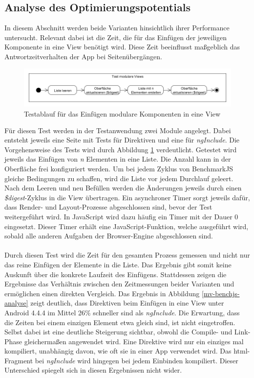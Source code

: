 \subsection{Analyse des Optimierungspotentials}
In diesem Abschnitt werden beide Varianten hinsichtlich ihrer Performance untersucht. Relevant dabei ist die Zeit, die für das Einfügen der jeweiligen Komponente in eine View benötigt wird. Diese Zeit beeinflusst maßgeblich das Antwortzeitverhalten der App bei Seitenübergängen. 
\begin{figure}[h]
	\centering
	\includegraphics[scale=0.4]{Bilder/Testablauf-ModularView.png}
	\caption{Testablauf für das Einfügen modulare Komponenten in eine View}
	\label{test-modulareview}
\end{figure}
Für diesen Test werden in der Testanwendung zwei Module angelegt. Dabei entsteht jeweils eine Seite mit Tests für Direktiven und eine für \emph{ngInclude}. Die Vorgehensweise des Tests wird durch Abbildung \ref{test-modulareview} verdeutlicht. Getestet wird jeweils das Einfügen von \emph{n} Elementen in eine Liste. Die Anzahl kann in der Oberfläche frei konfiguriert werden. Um bei jedem Zyklus von BenchmarkJS gleiche Bedingungen zu schaffen, wird die Liste vor jedem Durchlauf geleert. Nach dem Leeren und neu Befüllen werden die Änderungen jeweils durch einen \emph{\$digest}-Zyklus in die View übertragen. Ein asynchroner Timer sorgt jeweils dafür, dass Render- und Layout-Prozesse abgeschlossen sind, bevor der Test weitergeführt wird. In JavaScript wird dazu häufig ein Timer mit der Dauer 0 eingesetzt. Dieser Timer erhält eine JavaScript-Funktion, welche ausgeführt wird, sobald alle anderen Aufgaben der Browser-Engine abgeschlossen sind. 
\\\\
Durch diesen Test wird die Zeit für den gesamten Prozess gemessen und nicht nur das reine Einfügen der Elemente in die Liste. Das Ergebnis gibt somit keine Auskunft über die konkrete Laufzeit des Einfügens. Stattdessen zeigen die Ergebnisse das Verhältnis zwischen den Zeitmessungen beider Varianten und ermöglichen einen direkten Vergleich. Das Ergebnis in Abbildung \ref{mv-benchjs-analyse} zeigt deutlich, dass Direktiven beim Einfügen in eine View unter Android 4.4.4 im Mittel 26\% schneller sind als \emph{ngInclude}. Die Erwartung, dass die Zeiten bei einem einzigen Element etwa gleich sind, ist nicht eingetroffen. Selbst dabei ist eine deutliche Steigerung sichtbar, obwohl die Compile- und Link-Phase gleichermaßen angewendet wird. Eine Direktive wird nur ein einziges mal kompiliert, unabhängig davon, wie oft sie in einer App verwendet wird. Das \gls{html}-Fragment bei \emph{ngInclude} wird hingegen bei jedem Einbinden kompiliert. Dieser Unterschied spiegelt sich in diesen Ergebnissen nicht wider. 

